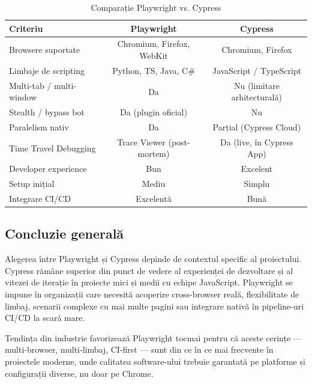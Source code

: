 \begin{table}[h!]
\centering
\begin{tabular}{lcc}
\toprule
\textbf{Criteriu} & \textbf{Playwright} & \textbf{Cypress} \\
\midrule
Browsere suportate       & Chromium, Firefox, WebKit & Chromium, Firefox \\
Limbaje de scripting     & Python, TS, Java, C\#     & JavaScript / TypeScript \\
Multi-tab / multi-window & Da                        & Nu (limitare arhitecturală) \\
Stealth / bypass bot     & Da (plugin oficial)        & Nu \\
Paralelism nativ         & Da                        & Parțial (Cypress Cloud) \\
Time Travel Debugging    & Trace Viewer (post-mortem) & Da (live, în Cypress App) \\
Developer experience     & Bun                       & Excelent \\
Setup inițial            & Mediu                     & Simplu \\
Integrare CI/CD          & Excelentă                 & Bună \\
\bottomrule
\end{tabular}
\caption{Comparație Playwright vs. Cypress}
\label{tab:comparatie}
\end{table}

\subsection*{Concluzie generală}

Alegerea între Playwright și Cypress depinde de contextul specific al proiectului.
Cypress rămâne superior din punct de vedere al experienței de dezvoltare și al vitezei
de iterație în proiecte mici și medii cu echipe JavaScript. Playwright se impune
în organizații care necesită acoperire cross-browser reală, flexibilitate de limbaj,
scenarii complexe cu mai multe pagini sau integrare nativă în pipeline-uri CI/CD
la scară mare.

Tendința din industrie favorizează Playwright tocmai pentru că aceste cerințe ---
multi-browser, multi-limbaj, CI-first --- sunt din ce în ce mai frecvente în
proiectele moderne, unde calitatea software-ului trebuie garantată pe platforme
și configurații diverse, nu doar pe Chrome.
